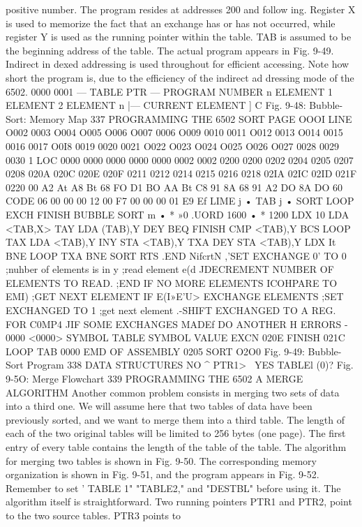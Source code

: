 \documentclass{book}
\begin{document}
{{{{{{{{{{{{{{{{{{{{{{{{{{{{{{{{{{{{{{{{{{{{{{{{{{{{{{{{{{{{{{{{{{{{{{{{{{{{{{{{{{{{{{{{{{{{{{positive number. The program resides at addresses 200 and follow
ing. Register X is used to memorize the fact that an exchange has
or has not occurred, while register Y is used as the running pointer
within the table. TAB is assumed to be the beginning address of
the table. The actual program appears in Fig. 9-49. Indirect in
dexed addressing is used throughout for efficient accessing. Note
how short the program is, due to the efficiency of the indirect ad
dressing mode of the 6502.
0000
0001
— TABLE PTR —
PROGRAM
NUMBER n
ELEMENT 1
ELEMENT 2
ELEMENT n
|—
CURRENT ELEMENT
] C
Fig. 9-48: Bubble-Sort: Memory Map
337
PROGRAMMING THE 6502
SORT PAGE OOOI
LINE
O002
0003
O004
O005
O006
O007
0006
O009
0010
0011
O012
0013
O014
0015
0016
0017
O0I8
0019
0020
0021
O022
O023
O024
O025
O026
O027
0028
0029
0030
1 LOC
0000
0000
0000
0000
0000
0002
0002
0200
0200
0202
0204
0205
0207
0208
020A
020C
020E
020F
0211
0212
0214
0215
0216
0218
02IA
02IC
02ID
021F
0220
00
A2
At
A8
Bt
68
FO
D1
BO
AA
Bt
C8
91
8A
68
91
A2
DO
8A
DO
60
CODE
06
00
00
00
12
00
F7
00
00
00
01
E9
Ef
LIME
j
•
TAB
j
•
SORT
LOOP
EXCH
FINISH
BUBBLE SORT m
• * »0
.UORD 1600
• * 1200
LDX 10
LDA <TAB,X>
TAY
LDA (TAB),Y
DEY
BEQ FINISH
CMP <TAB),Y
BCS LOOP
TAX
LDA <TAB),Y
INY
STA <TAB),Y
TXA
DEY
STA <TAB),Y
LDX It
BNE LOOP
TXA
BNE SORT
RTS
.END
NifcrtN
,'SET EXCHANGE 0' TO 0
;nuhber of elements is in y
;read element e(d
JDECREMENT NUMBER OF ELEMENTS TO READ.
;END IF NO MORE ELEMENTS
ICOHPARE TO EMI)
;GET NEXT ELEMENT IF E(I»E'U>
{EXCHANGE ELEMENTS
;SET EXCHANGED TO 1
;get next element
.-SHIFT EXCHANGED TO A REG. FOR C0MP4
JIF SOME EXCHANGES MADEf DO ANOTHER H
ERRORS - 0000 <0000>
SYMBOL TABLE
SYMBOL VALUE
EXCN 020E FINISH 021C LOOP
TAB 0000
EMD OF ASSEMBLY
0205 SORT O2O0
Fig. 9-49: Bubble-Sort Program
338
DATA STRUCTURES
NO ^ PTR1> \ YES
TABLEl (0)?
Fig. 9-5O: Merge Flowchart
339
PROGRAMMING THE 6502
A MERGE ALGORITHM
Another common problem consists in merging two sets of data
into a third one. We will assume here that two tables of data have
been previously sorted, and we want to merge them into a third table. The
length of each of the two original tables will be limited to 256 bytes (one
page). The first entry of every table contains the length of the table
of the table.
The algorithm for merging two tables is shown in Fig. 9-50. The
corresponding memory organization is shown in Fig. 9-51, and the
program appears in Fig. 9-52. Remember to set ' TABLE 1"
"TABLE2," and "DESTBL" before using it.
The algorithm itself is straightforward. Two running pointers
PTR1 and PTR2, point to the two source tables. PTR3 points to
}}}}}}}}}}}}}}}}}}}}}}}}}}}}}}}}}}}}}}}}}}}}}}}}}}}}}}}}}}}}}}}}}}}}}}}}}}}}}}}}}}}}}}}}}}}}}}}
\end{document}
